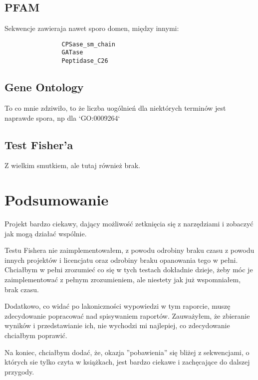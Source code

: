 \documentclass{article}
\begin{document}
        \subsection{PFAM}

            Sekwencje zawieraja nawet sporo domen, między innymi:
            \begin{verbatim}
                CPSase_sm_chain
                GATase
                Peptidase_C26
            \end{verbatim}


        \subsection{Gene Ontology}

            To co mnie zdziwiło, to że liczba uogólnień dla niektórych terminów jest naprawde spora, np dla `GO:0009264`


        \subsection{Test Fisher'a}

            Z wielkim smutkiem, ale tutaj również brak.


    \section{Podsumowanie}

        Projekt bardzo ciekawy, dający możliwość zetknięcia się z narzędziami i zobaczyć jak mogą działać wspólnie.

        Testu Fishera nie zaimplementowałem, z powodu odrobiny braku czasu z powodu innych projektów i licencjatu oraz odrobiny braku opanowania tego w pełni. Chciałbym w pełni zrozumieć co się w tych testach dokładnie dzieje, żeby móc je zaimplementować z pełnym zrozumieniem, ale niestety jak już wspomniałem, brak czasu.

        Dodatkowo, co widać po lakoniczności wypowiedzi w tym raporcie, muszę zdecydowanie popracować nad spisywaniem raportów. Zauważyłem, że zbieranie wyników i przedstawianie ich, nie wychodzi mi najlepiej, co zdecydowanie chciałbym poprawić.

        Na koniec, chciałbym dodać, że, okazja ''pobawienia'' się bliżej z sekwencjami, o których sie tylko czyta w książkach, jest bardzo ciekawe i zachęcające do dalszej przygody.
\end{document}
